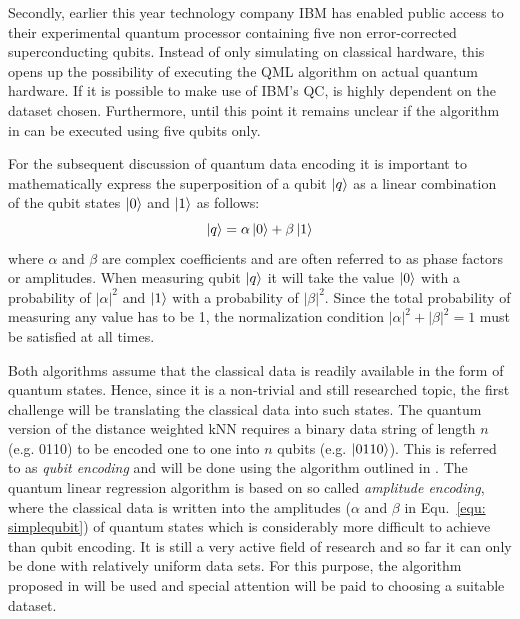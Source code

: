 \documentclass[a4paper]{article}
\newcommand*{\0}{$\ket{0}$}
\newcommand*{\1}{$\ket{1}$}
\begin{document}
Secondly, earlier this year technology company IBM has enabled public access to their experimental quantum processor containing five non error-corrected superconducting qubits. Instead of only simulating on classical hardware, this opens up the possibility of executing the QML algorithm on actual quantum hardware. If it is possible to make use of IBM's QC, is highly dependent on the dataset chosen. Furthermore, until this point it remains unclear if the algorithm in \cite{Schuld2016} can be executed using five qubits only.

For the subsequent discussion of quantum data encoding it is important to mathematically express the superposition of a qubit $\ket{q}$ as a linear combination of the qubit states \0 and \1 as follows:
\begin{equation}
\label{equ: simplequbit}
\ket{q} = \alpha \ket{0} + \beta \ket{1}
\end{equation}
where $\alpha$ and $\beta$ are complex coefficients and are often referred to as phase factors or amplitudes. When measuring qubit $\ket{q}$ it will take the value \0 with a probability of ${|\alpha|}^{2}$ and \1 with a probability of ${|\beta|}^{2}$. Since the total probability of measuring any value has to be 1, the normalization condition ${|\alpha|}^{2} + {|\beta|}^{2} =  1$ must be satisfied at all times.

Both algorithms assume that the classical data is readily available in the form of quantum states. Hence, since it is a non-trivial and still researched topic, the first challenge will be translating the classical data into such states. The quantum version of the distance weighted kNN requires a binary data string of length $n$ (e.g. 0110) to be encoded one to one into $n$ qubits (e.g. $\ket{0110}$). This is referred to as \textit{qubit encoding} and will be done using the algorithm outlined in \cite{ventura1999initializing}.
The quantum linear regression algorithm is based on so called \textit{amplitude encoding}, where the classical data is written into the amplitudes ($\alpha$ and $\beta$ in Equ.~\ref{equ: simplequbit}) of quantum states which is considerably more difficult to achieve than qubit encoding. It is still a very active field of research and so far it can only be done with relatively uniform data sets. For this purpose, the algorithm proposed in \cite{grover2002creating} will be used and special attention will be paid to choosing a suitable dataset.
\end{document}
